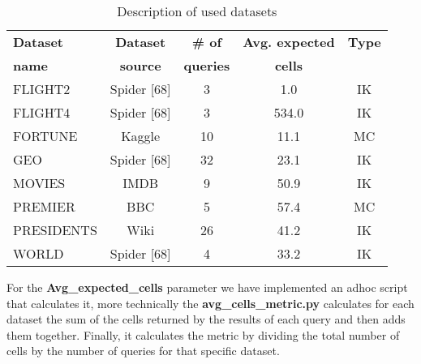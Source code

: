 \documentclass[12pt,a4paper]{article}
\begin{document}
\begin{table}[h]
\centering
\begin{tabular}{lcccc}
\toprule
\textbf{Dataset} & \textbf{Dataset} & \textbf{\# of} & \textbf{Avg. expected} & \textbf{Type} \\
\textbf{name} & \textbf{source} & \textbf{queries} & \textbf{cells} & \\
\midrule
FLIGHT2 & Spider [68] & 3 & 1.0 & IK \\
FLIGHT4 & Spider [68] & 3 & 534.0 & IK \\
FORTUNE & Kaggle & 10 & 11.1 & MC \\
GEO & Spider [68] & 32 & 23.1 & IK \\
MOVIES & IMDB & 9 & 50.9 & IK \\
PREMIER & BBC & 5 & 57.4 & MC \\
PRESIDENTS & Wiki & 26 & 41.2 & IK \\
WORLD & Spider [68] & 4 & 33.2 & IK \\


\bottomrule
\end{tabular}
\caption{Description of used datasets}
\label{tab:datasets}
\end{table}


For the \textbf{Avg\_expected\_cells} parameter we have implemented an ad\-hoc script that calculates it, more technically the \textbf{avg\_cells\_metric.py} calculates for each dataset the sum of the cells returned by the results of each query and then adds them together.
Finally, it calculates the metric by dividing the total number of cells by the number of queries for that specific dataset.
\end{document}
